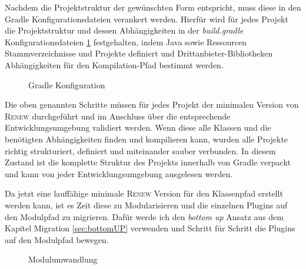 	Nachdem die Projektstruktur der gewünschten Form entspricht, muss diese in den Gradle Konfigurationsdateien verankert werden. Hierfür wird für jedes Projekt die Projektstruktur und dessen Abhängigkeiten in der \textit{build.gradle} Konfigurationsdateien \ref{fig:gradle_project} festgehalten, indem Java sowie Ressourcen Stammverzeichnisse und Projekte definiert und Drittanbieter-Bibliotheken Abhängigkeiten für den Kompilation-Pfad bestimmt werden. \bigbreak

 		\begin{figure}[h!]
		\centering
		\begin{minipage}{7cm}
		\end{minipage}
		\caption{Gradle Konfiguration}
		\label{fig:gradle_project}
	\end{figure}
 	Die oben genannten Schritte müssen für jedes Projekt der minimalen Version von \textsc{Renew} durchgeführt und im Anschluss über die entsprechende Entwicklungsumgebung  validiert werden. Wenn diese alle Klassen und die benötigten Abhängigkeiten finden und kompilieren kann, wurden alle Projekte richtig strukturiert, definiert und miteinander sauber verbunden. In diesem Zustand ist die komplette Struktur des Projekts innerhalb von Gradle verpackt und kann von jeder Entwicklungsumgebung ausgelesen werden. \newline

	Da jetzt eine lauffähige minimale \textsc{Renew} Version für den Klassenpfad erstellt werden kann, ist es Zeit diese zu Modularisieren und die einzelnen Plugins auf den Modulpfad zu migrieren. Dafür werde ich den \textit{bottom up} Ansatz aus dem Kapitel Migration \ref{sec:bottomUP} verwenden und Schritt für Schritt die Plugins auf den Modulpfad bewegen.

	\begin{figure}[h!]
		\centering
		\begin{minipage}{7cm}
		\end{minipage}
		\caption{Modulumwandlung}
		\label{fig:module_project}
	\end{figure}

